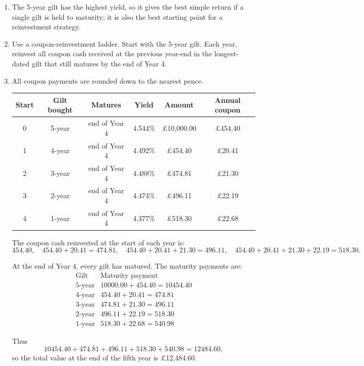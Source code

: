 \documentclass[12pt]{article}
\begin{document}
\begin{enumerate}[label=\textbf{Q\arabic*.}, start=4]
\begin{enumerate}[label=(\alph*)]
\item 
The 5-year gilt has the highest yield, so it gives the best simple return if a single gilt is held to maturity; it is also the best starting point for a reinvestment strategy.

\item 
Use a coupon-reinvestment ladder. Start with the 5-year gilt. Each year, reinvest all coupon cash received at the previous year-end in the longest-dated gilt that still matures by the end of Year 4.

\item 
All coupon payments are rounded down to the nearest pence.

\begin{center}
\small
\begin{tabular}{c|c|c|c|c|c}
\textbf{Start} & \textbf{Gilt bought} & \textbf{Matures} & \textbf{Yield} & \textbf{Amount} & \textbf{Annual coupon}\\
\hline
0 & 5-year & end of Year 4 & 4.544\% & \pounds 10,000.00 & \pounds 454.40\\
1 & 4-year & end of Year 4 & 4.492\% & \pounds 454.40 & \pounds 20.41\\
2 & 3-year & end of Year 4 & 4.488\% & \pounds 474.81 & \pounds 21.30\\
3 & 2-year & end of Year 4 & 4.474\% & \pounds 496.11 & \pounds 22.19\\
4 & 1-year & end of Year 4 & 4.377\% & \pounds 518.30 & \pounds 22.68
\end{tabular}
\end{center}

The coupon cash reinvested at the start of each year is:
\[
454.40,\quad 454.40+20.41=474.81,\quad 454.40+20.41+21.30=496.11,\quad 454.40+20.41+21.30+22.19=518.30.
\]

At the end of Year 4, every gilt has matured. The maturity payments are:
\[
\begin{array}{c|c}
\text{Gilt} & \text{Maturity payment}\\
\hline
5\text{-year} & 10000.00+454.40=10454.40\\
4\text{-year} & 454.40+20.41=474.81\\
3\text{-year} & 474.81+21.30=496.11\\
2\text{-year} & 496.11+22.19=518.30\\
1\text{-year} & 518.30+22.68=540.98
\end{array}
\]

Thus
\[
10454.40+474.81+496.11+518.30+540.98=12484.60,
\]
so the total value at the end of the fifth year is \pounds 12,484.60.


\end{enumerate}
\end{enumerate}
\end{document}
